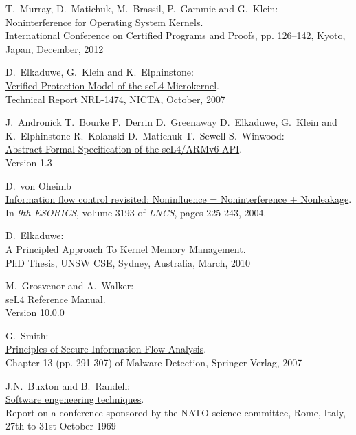 \documentclass[11pt,a4paper,twoside,BCOR=20mm]{article}
\begin{document}
	\begin{thebibliography}{99}

	T.\ Murray, D.\ Matichuk, M.\ Brassil, P.\ Gammie and G.\ Klein:	\\ 
	\href{http://www.ssrg.nicta.com/publications/nicta_full_text/6004.pdf}{%
		Noninterference for Operating System Kernels}. \\
    International Conference on Certified Programs and Proofs, pp. 126–142, Kyoto, Japan, December, 2012

	D.\ Elkaduwe, G.\ Klein and K.\ Elphinstone:	\\ 
	\href{http://ts.data61.csiro.au/publications/nicta_full_text/1474.pdf}{%
		Verified Protection Model of the seL4 Microkernel}. \\
   	Technical Report NRL-1474, NICTA, October, 2007
   	
	J.\ Andronick T.\ Bourke P.\ Derrin D.\ Greenaway D.\ Elkaduwe, G.\ Klein and K.\ Elphinstone R.\ Kolanski D.\ Matichuk T.\ Sewell S.\ Winwood:	\\ 
	\href{https://sel4.systems/Info/Docs/seL4-spec.pdf}{%
		Abstract Formal Specification of the seL4/ARMv6 API}. \\
   	Version 1.3
   	
	D.\ von Oheimb	\\ 
	\href{https://pdfs.semanticscholar.org/21ea/6c722535ed0a22175187796b43c114e14ee8.pdf}{%
		Information flow control revisited: Noninfluence = Noninterference + Nonleakage}. \\
   	In \textit{9th ESORICS}, volume 3193 of \textit{LNCS}, pages 225-243, 2004.
   	
	D.\ Elkaduwe:	\\ 
	\href{https://ts.data61.csiro.au/publications/papers/Elkaduwe:phd.pdf}{%
		A Principled Approach To Kernel Memory Management}. \\
   	PhD Thesis, UNSW CSE, Sydney, Australia, March, 2010

	M.\ Grosvenor and A.\ Walker:	\\ 
	\href{http://sel4.systems/Info/Docs/seL4-manual-latest.pdf}{%
		seL4 Reference Manual}. \\
   	Version 10.0.0
   	
	G.\ Smith:\\ 
	\href{http://users.cis.fiu.edu/~smithg/papers/sif06.pdf}{%
		Principles of Secure Information Flow Analysis}. \\
   	Chapter 13 (pp. 291-307) of Malware Detection,  Springer-Verlag, 2007
   	
   	J.N.\ Buxton and B.\ Randell:\\
   	\href{http://homepages.cs.ncl.ac.uk/brian.randell/NATO/nato1969.PDF}{%
   		Software engeneering techniques}. \\
   		Report on a conference sponsored by the NATO science committee, Rome, Italy, 27th to 31st October 1969
\end{thebibliography}
	
\end{document}
